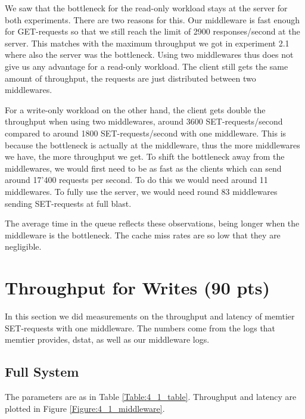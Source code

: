 \documentclass[11pt,a4paper]{article}
\begin{document}
We saw that the bottleneck for the read-only workload stays at the server for both experiments. There are two reasons for this. Our middleware is fast enough for GET-requests so that we still reach the limit of 2900 responses/second at the server. This matches with the maximum throughput we got in experiment 2.1 where also the server was the bottleneck. Using two middlewares thus does not give us any advantage for a read-only workload. The client still gets the same amount of throughput, the requests are just distributed between two middlewares. 

For a write-only workload on the other hand, the client gets double the throughput when using two middlewares, around 3600 SET-requests/second compared to around 1800 SET-requests/second with one middleware. This is because the bottleneck is actually at the middleware, thus the more middlewares we have, the more throughput we get. To shift the bottleneck away from the middlewares, we would first need to be as fast as the clients which can send around 17'400 requests per second. To do this we would need around 11 middlewares. To fully use the server, we would need round 83 middlewares sending SET-requests at full blast.

The average time in the queue reflects these observations, being longer when the middleware is the bottleneck. The cache miss rates are so low that they are negligible.

\section{Throughput for Writes (90 pts)}

In this section we did measurements on the throughput and latency of memtier SET-requests with one middleware. The numbers come from the logs that memtier provides, dstat, as well as our middleware logs.

\subsection{Full System}

The parameters are as in Table \ref{Table:4_1_table}. Throughput and latency are plotted in Figure \ref{Figure:4_1_middleware}. 
\end{document}
